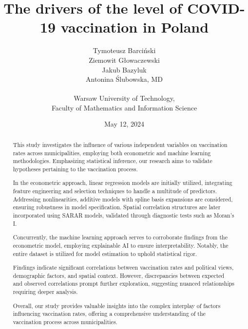 \documentclass[a4paper,12pt]{article} %
\title{The drivers of the level of COVID-19 vaccination in Poland}
\date{May 12, 2024}
\author{
    Tymoteusz Barciński\\
    Ziemowit Głowaczewski\\
    Jakub Bazyluk\\
    Antonina Ślubowska, MD\\
    \\
    Warsaw University of Technology,\\
    Faculty of Mathematics and Information Science
}
\begin{document}

\maketitle

\begin{abstract}


This study investigates the influence of various independent variables on vaccination rates across municipalities, employing both econometric and machine learning methodologies. Emphasizing statistical inference, our research aims to validate hypotheses pertaining to the vaccination process.

In the econometric approach, linear regression models are initially utilized, integrating feature engineering and selection techniques to handle a multitude of predictors. Addressing nonlinearities, additive models with spline basis expansions are considered, ensuring robustness in model specification. Spatial correlation structures are later incorporated using SARAR models, validated through diagnostic tests such as Moran's I.

Concurrently, the machine learning approach serves to corroborate findings from the econometric model, employing explainable AI to ensure interpretability. Notably, the entire dataset is utilized for model estimation to uphold statistical rigor.

Findings indicate significant correlations between vaccination rates and political views, demographic factors, and spatial context. However, discrepancies between expected and observed correlations prompt further exploration, suggesting nuanced relationships requiring deeper analysis.

Overall, our study provides valuable insights into the complex interplay of factors influencing vaccination rates, offering a comprehensive understanding of the vaccination process across municipalities.

\end{abstract}
\end{document}

